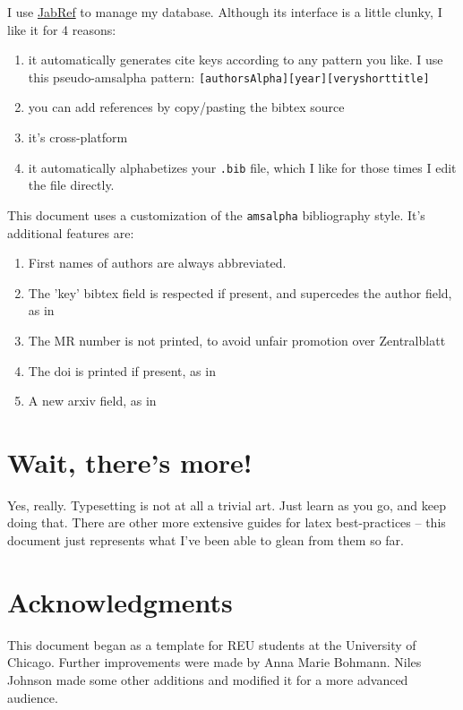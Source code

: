 \documentclass[11pt,oneside,draft]{amsart}
\begin{document}
I use \href{http://jabref.sourceforge.net/}{JabRef} to manage my
database.  Although its interface is a little clunky, I like it for 4 reasons:
\begin{enumerate}
\item it automatically generates cite keys according to any pattern
  you like.  I use this pseudo-amsalpha pattern: \texttt{[authorsAlpha][year][veryshorttitle]}
\item you can add references by copy/pasting the bibtex source
\item it's cross-platform
\item it automatically alphabetizes your \texttt{.bib} file, which I
  like for those times I edit the file directly.
\end{enumerate}

This document uses a customization of the \texttt{amsalpha}
bibliography style.  It's additional features are:
\begin{enumerate}
\item First names of authors are always abbreviated.
\item The 'key' bibtex field is respected if present, and supercedes
  the author field, as in \cite{ATC,sage}
\item The MR number is not printed, to avoid unfair promotion over
  Zentralblatt
\item The doi is printed if present, as in \cite{JN2010Complex}
\item A new arxiv field, as in \cite{GO2012Infinite,JN2010Complex}
\end{enumerate}
 

\section{Wait, there's more!}

Yes, really.  Typesetting is not at all a trivial art.  Just learn as
you go, and keep doing that.  There are other more extensive guides
for latex best-practices -- this document just represents what I've
been able to glean from them so far.

\section*{Acknowledgments}  

This document began as a template for REU students at the University
of Chicago.  Further improvements were made by Anna Marie Bohmann.
Niles Johnson made some other additions and modified it for a more
advanced audience.


%
\end{document}
